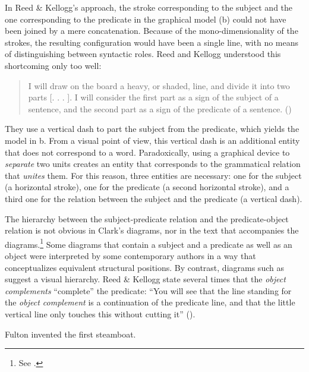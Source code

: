 \documentclass[output=paper]{langsci/langscibook}
\begin{document}
In Reed \& Kellogg’s approach, the stroke corresponding to the subject and the one corresponding to the predicate in the graphical model (b) could not have been joined by a mere concatenation. Because of the mono-dimensionality of the strokes, the resulting configuration would have been a single line, with no means of distinguishing between syntactic roles. Reed and Kellogg understood this shortcoming only too well:

\begin{quote}
I will draw on the board a heavy, or shaded, line, and divide it into two parts [. . . ]. I will consider the first part as a sign of the subject of a sentence, and the second part as a sign of the predicate of a sentence. (\citealt[17]{reed_graded_1879})
\end{quote}

They use a vertical dash to part the subject from the predicate, which yields the model in b. From a visual point of view, this vertical dash is an additional entity that does not correspond to a word. Paradoxically, using a graphical device to \textit{separate} two units creates an entity that corresponds to the grammatical relation that \textit{unites} them. For this reason, three entities are necessary: one for the subject (a horizontal stroke), one for the predicate (a second horizontal stroke), and a third one for the relation between the subject and the predicate (a vertical dash).

The hierarchy between the subject-predicate relation and the predicate-object relation is not obvious in Clark’s diagrams, nor in the text that accompanies the diagrams.\footnote{ \textrm{See \citet[§4.3.2]{imrenyi_how_2020}.}} Some diagrams that contain a subject and a predicate as well as an object were interpreted by some contemporary authors \citep[30]{jewell_grammatical_1867} in a way that conceptualizes equivalent structural positions. By contrast, diagrams such as  suggest a visual hierarchy. Reed \& Kellogg state several times that the \textit{object complements} “complete” the predicate: “You will see that the line standing for the \textit{object complement} is a continuation of the predicate line, and that the little vertical line only touches this without cutting it” (\citealt[54]{reed_graded_1879}).

\ea \label{ex:4:3} Fulton invented the first steamboat.\z
\end{document}
